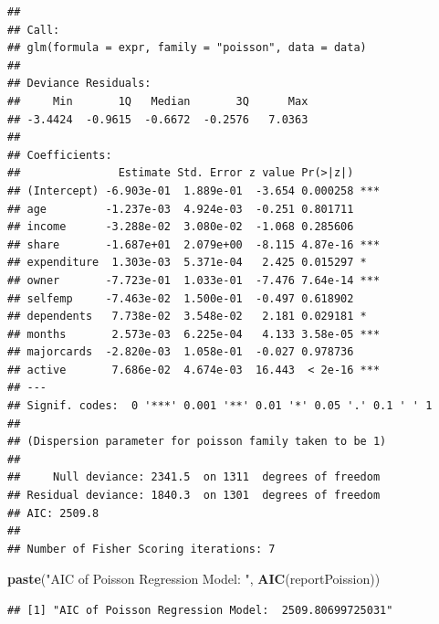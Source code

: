\documentclass[
]{article}
\newenvironment{Shaded}{\begin{snugshade}}{\end{snugshade}}
\newcommand{\DataTypeTok}[1]{\textcolor[rgb]{0.13,0.29,0.53}{#1}}
\newcommand{\DecValTok}[1]{\textcolor[rgb]{0.00,0.00,0.81}{#1}}
\newcommand{\KeywordTok}[1]{\textcolor[rgb]{0.13,0.29,0.53}{\textbf{#1}}}
\newcommand{\NormalTok}[1]{#1}
\newcommand{\OperatorTok}[1]{\textcolor[rgb]{0.81,0.36,0.00}{\textbf{#1}}}
\newcommand{\StringTok}[1]{\textcolor[rgb]{0.31,0.60,0.02}{#1}}
\begin{document}
\begin{verbatim}
## 
## Call:
## glm(formula = expr, family = "poisson", data = data)
## 
## Deviance Residuals: 
##     Min       1Q   Median       3Q      Max  
## -3.4424  -0.9615  -0.6672  -0.2576   7.0363  
## 
## Coefficients:
##               Estimate Std. Error z value Pr(>|z|)    
## (Intercept) -6.903e-01  1.889e-01  -3.654 0.000258 ***
## age         -1.237e-03  4.924e-03  -0.251 0.801711    
## income      -3.288e-02  3.080e-02  -1.068 0.285606    
## share       -1.687e+01  2.079e+00  -8.115 4.87e-16 ***
## expenditure  1.303e-03  5.371e-04   2.425 0.015297 *  
## owner       -7.723e-01  1.033e-01  -7.476 7.64e-14 ***
## selfemp     -7.463e-02  1.500e-01  -0.497 0.618902    
## dependents   7.738e-02  3.548e-02   2.181 0.029181 *  
## months       2.573e-03  6.225e-04   4.133 3.58e-05 ***
## majorcards  -2.820e-03  1.058e-01  -0.027 0.978736    
## active       7.686e-02  4.674e-03  16.443  < 2e-16 ***
## ---
## Signif. codes:  0 '***' 0.001 '**' 0.01 '*' 0.05 '.' 0.1 ' ' 1
## 
## (Dispersion parameter for poisson family taken to be 1)
## 
##     Null deviance: 2341.5  on 1311  degrees of freedom
## Residual deviance: 1840.3  on 1301  degrees of freedom
## AIC: 2509.8
## 
## Number of Fisher Scoring iterations: 7
\end{verbatim}

\begin{Shaded}
\begin{Highlighting}[]
\KeywordTok{paste}\NormalTok{(}\StringTok{"AIC of Poisson Regression Model: "}\NormalTok{, }\KeywordTok{AIC}\NormalTok{(reportPoission))}
\end{Highlighting}
\end{Shaded}

\begin{verbatim}
## [1] "AIC of Poisson Regression Model:  2509.80699725031"
\end{verbatim}

\begin{Shaded}
\end{Shaded}
\end{document}
